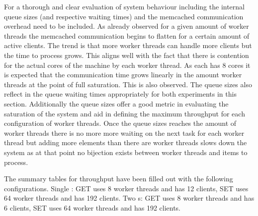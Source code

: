         For a thorough and clear evaluation of system behaviour including the internal queue sizes (and respective
        waiting times) and the memcached communication overhead need to be included.\newline
        As already observed for a given amount of worker threads the memcached communication begins to flatten for a
        certain amount of active clients. The trend is that more worker threads can handle more clients but the time to
        process grows. This aligns well with the fact that there is contention for the actual cores of the machine by
        each worker thread. As each \mw{} has 8 cores it is expected that the communication time grows linearly in the
        amount worker threads at the point of full saturation. This is also observed. The queue sizes also reflect in
        the queue waiting times appropriately for both experiments in this section. Additionally the queue sizes offer a
        good metric in evaluating the saturation of the system and aid in defining the maximum throughput for each
        configuration of worker threads. Once the queue sizes reaches the amount of worker threads there is no more more
        waiting on the next task for each worker thread but adding more elements than there are worker threads slows
        down the system as at that point no bijection exists between worker threads and items to process.

        The summary tables for throughput have been filled out with the following configurations.
        Single \mw{}: GET uses 8 worker threads and has 12 clients, SET uses 64 worker threads and has 192 clients.
        Two \mw{}s: GET uses 8 worker threads and has 6 clients, SET uses 64 worker threads and has 192 clients.

